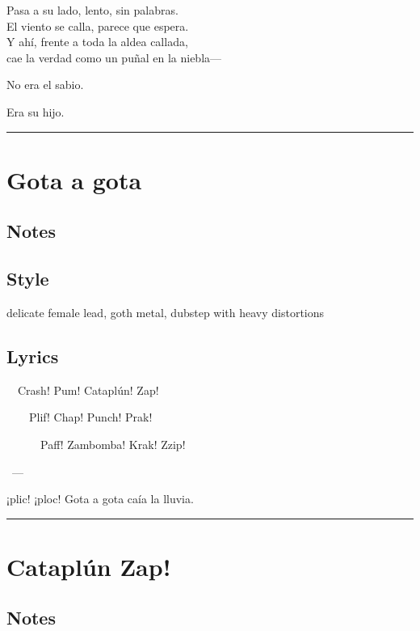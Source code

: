 \documentclass[]{article}
\begin{document}
Pasa a su lado, lento, sin palabras.\\
El viento se calla, parece que espera.\\
Y ahí, frente a toda la aldea callada,\\
cae la verdad como un puñal en la niebla---

No era el sabio.

Era su hijo.

\begin{center}\rule{0.5\linewidth}{0.5pt}\end{center}

\section{Gota a gota}\label{gota-a-gota}

\subsection{Notes}\label{notes-37}

\subsection{Style}\label{style-37}

delicate female lead, goth metal, dubstep with heavy distortions

\subsection{Lyrics}\label{lyrics-37}

~~Crash! Pum! Cataplún! Zap!

~~~~Plif! Chap! Punch! Prak!

~~~~~~Paff! Zambomba! Krak! Zzip!

~---

¡plic! ¡ploc! Gota a gota caía la lluvia.

\begin{center}\rule{0.5\linewidth}{0.5pt}\end{center}

\section{Cataplún Zap!}\label{catapluxfan-zap}

\subsection{Notes}\label{notes-38}
\end{document}
